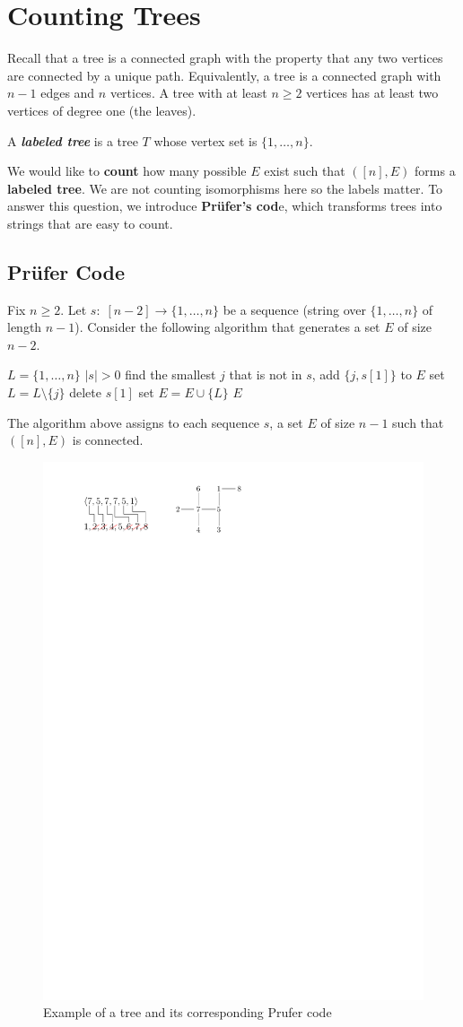 \section{Counting Trees}

Recall that a tree is a connected graph with the property that any two vertices are connected by a unique path. Equivalently, a tree is a connected graph with $n-1$ edges and $n$ vertices. A tree with at least $n \geq 2$ vertices has at least two vertices of degree one (the leaves).

\begin{definition}
    A \textit{\textbf{labeled tree}} is a tree $T$ whose vertex set is $\{1,\ldots,n\}$.
\end{definition}

We would like to \textbf{count} how many possible $E$ exist such that $([n], E)$ forms a \textbf{labeled tree}. We are not counting isomorphisms here so the labels matter. To answer this question, we introduce \textbf{Pr\"ufer's cod}e, which transforms trees into strings that are easy to count.

\subsection{Pr\"ufer Code}

Fix $n \geq 2$. Let $s:\; [n-2] \to \{1,\ldots,n\}$ be a sequence (string over $\{1,\ldots,n\}$ of length $n-1$). Consider the following algorithm that generates a set $E$ of size $n-2$.
\begin{codebox}
    \li $L = \{1,\ldots,n\}$
    \li \While $|s| > 0$ \Do
        \li find the smallest $j$ that is not in $s$, add $\{j,s[1]\}$ to $E$
        \li set $L = L \setminus \{j\}$
        \li delete $s[1]$
    \End
    \li set $E = E \cup \{L\}$
    \li \Return $E$
\end{codebox}
The algorithm above assigns to each sequence $s$, a set $E$ of size $n-1$ such that $([n], E)$ is connected.

\begin{figure}[htbp]
    \centering
    \includegraphics[width=0.5\linewidth]{figures/prufer-code-example.pdf}
    \caption{Example of a tree and its corresponding Prufer code}
    \label{fig:prufer-code-example}
\end{figure}

